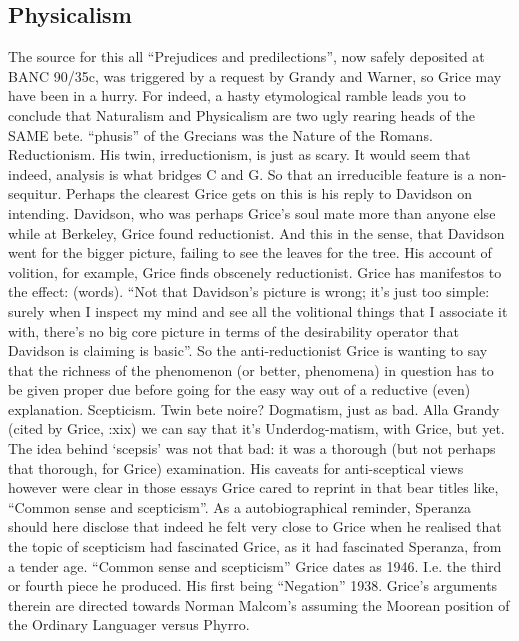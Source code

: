 \documentclass[10pt,titlepage]{book}
\begin{document}
{\subsection{Physicalism}

The  source for this all “Prejudices and predilections”, now 
safely deposited at BANC  90/35c, was triggered by a request by Grandy and 
Warner, so Grice may have been  in a hurry. For indeed, a hasty etymological 
ramble leads you to conclude that  Naturalism and Physicalism are two ugly 
rearing heads of the SAME bete. “phusis”  of the Grecians was the Nature of 
the Romans.   
Reductionism. His  twin, irreductionism, is just as scary. It would seem 
that indeed, analysis is  what bridges C and G. So that an irreducible feature 
is a non-sequitur.  Perhaps the clearest Grice gets on this  is his reply 
to Davidson on intending. Davidson, who was perhaps Grice’s soul  mate more 
than anyone else while at Berkeley, Grice found reductionist. And this  in 
the sense, that Davidson went for the bigger picture, failing to see the  
leaves for the tree. His account of volition, for example, Grice finds obscenely 
 reductionist. Grice has manifestos to the effect: (words). “Not that 
Davidson’s  picture is wrong; it’s just too simple: surely when I inspect my 
mind and see  all the volitional things that I associate it with, there’s no 
big core picture  in terms of the desirability operator that Davidson is 
claiming is basic”. So  the anti-reductionist Grice is wanting to say that the 
richness of the  phenomenon (or better,  phenomena)  in question has to be 
given proper due before going for the easy way out of a  reductive (even) 
explanation. 
Scepticism. Twin  bete noire? Dogmatism, just as bad. Alla Grandy (cited by 
Grice, \cite{grice89}:xix) we can  say that it’s Underdog-matism, with Grice, but yet. 
The idea behind ‘scepsis’  was not that bad: it was a thorough (but not 
perhaps that thorough, for Grice)  examination. His caveats for anti-sceptical 
views however were clear in those  essays Grice cared to reprint in \cite{grice89} 
that bear titles like, “Common sense and  scepticism”. As a autobiographical 
reminder, Speranza should here disclose that  indeed he felt very close to 
Grice when he realised that the topic of scepticism  had fascinated Grice, as 
it had fascinated Speranza, from a tender age. “Common  sense and scepticism”
 Grice dates as 1946. I.e. the third or fourth piece he  produced. His 
first being “Negation” 1938. Grice’s arguments therein are  directed towards 
Norman Malcom’s assuming the Moorean position of the Ordinary  Languager 
versus Phyrro. 

}
\end{document}

